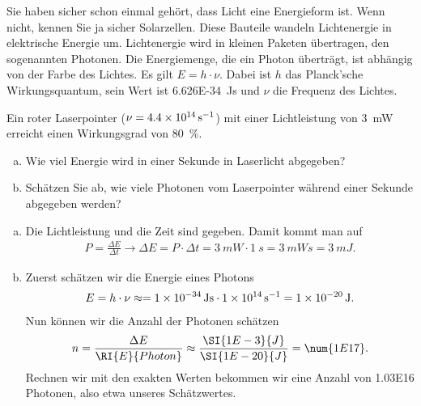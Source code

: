 
\begin{aufgabe}
	Sie haben sicher schon einmal gehört, dass Licht eine Energieform ist. Wenn nicht, kennen Sie ja sicher Solarzellen.
	Diese Bauteile wandeln Lichtenergie in elektrische Energie um. Lichtenergie wird in kleinen Paketen übertragen, den
	sogenannten Photonen. Die Energiemenge, die ein Photon überträgt, ist abhängig von der Farbe des Lichtes.
	Es gilt $E=h\cdot \nu$. Dabei ist $h$ das Planck'sche Wirkungsquantum, sein Wert ist \SI{6.626E-34}{Js} und $\nu$
	die Frequenz des Lichtes.

	Ein roter Laserpointer ($\nu=\SI{4.4E14}{s^{-1}}$) mit einer Lichtleistung von \SI{3}{mW} erreicht einen Wirkungsgrad von \SI{80}{\percent}.
	\begin{enumerate} [a)]
		\item Wie viel Energie wird in einer Sekunde in Laserlicht abgegeben?
		\item Schätzen Sie ab, wie viele Photonen vom Laserpointer während einer Sekunde abgegeben werden?
	\end{enumerate}
	\begin{loesung}
		\begin{enumerate}[a)]
			\item Die Lichtleistung und die Zeit sind gegeben. Damit kommt man auf
				\begin{eqnarray*}
					P=\frac{\Delta E}{\Delta t} \to \Delta E= P\cdot\Delta t=\SI{3}{mW}\cdot\SI{1}{s}=\SI{3}{mWs}=\SI{3}{mJ}\text{.}
				\end{eqnarray*}
			\item Zuerst schätzen wir die Energie eines Photons
				\begin{eqnarray*}
					E=h\cdot\nu\approx=\SI{1E-34}{Js}\cdot\SI{1E14}{s^{-1}} = \SI{1E-20}{J}\text{.}
				\end{eqnarray*}
Nun können wir die Anzahl der Photonen schätzen
				\begin{eqnarray*}
					n=\frac{\Delta E}{\RI{E}{Photon}}\approx\frac{\SI{1E-3}{J}}{\SI{1E-20}{J}}=\num{1E17}\text{.}
				\end{eqnarray*}
				Rechnen wir mit den exakten Werten bekommen wir eine Anzahl von \num{1.03E16} Photonen, also etwa
				 unseres Schätzwertes.
		\end{enumerate}
	\end{loesung}
\end{aufgabe}
